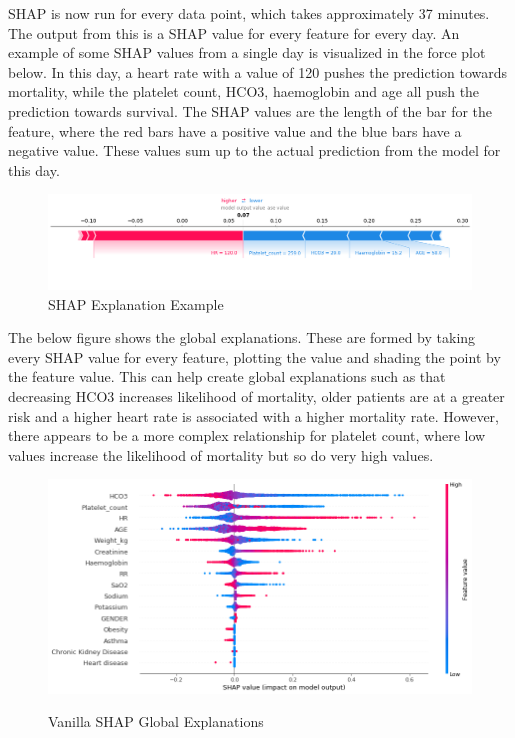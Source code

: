 \documentclass[12pt]{article}
\begin{document}
SHAP is now run for every data point, which takes approximately 37 minutes. The output from this is a SHAP value for every feature for every day. An example of some SHAP values from a single day is visualized in the force plot below. In this day, a heart rate with a value of 120 pushes the prediction towards mortality, while the platelet count, HCO3, haemoglobin and age all push the prediction towards survival. The SHAP values are the length of the bar for the feature, where the red bars have a positive value and the blue bars have a negative value. These values sum up to the actual prediction from the model for this day.

\begin{figure}[H]
\centering\caption{SHAP Explanation Example}
\includegraphics[scale=0.35]{SHAP individual explanation.png}
\end{figure}

The below figure shows the global explanations. These are formed by taking every SHAP value for every feature, plotting the value and shading the point by the feature value. This can help create global explanations such as that decreasing HCO3 increases likelihood of mortality, older patients are at a greater risk and a higher heart rate is associated with a higher mortality rate. However, there appears to be a more complex relationship for platelet count, where low values increase the likelihood of mortality but so do very high values.

\begin{figure}[H]
\centering\caption{Vanilla SHAP Global Explanations}
\includegraphics[scale=0.4]{Vanilla SHAP Global.png}
\label{Vanilla SHAP Global}
\end{figure}
\end{document}
